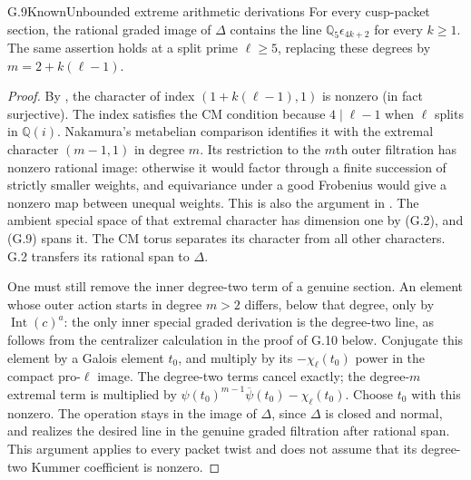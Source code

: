 \begin{statement}{G.9}{Known}{Unbounded extreme arithmetic derivations}
For every cusp-packet section, the rational graded image of $\Delta$
contains the line $\mathbb Q_5\epsilon_{4k+2}$ for every $k\ge1$.
The same assertion holds at a split prime $\ell\ge5$, replacing these
degrees by $m=2+k(\ell-1)$.
\end{statement}
\begin{proof}
By \citet[Theorem 1.5(4)]{Ishii2025}, the character of index
$(1+k(\ell-1),1)$ is nonzero (in fact surjective). The index satisfies
the CM condition because $4\mid\ell-1$ when $\ell$ splits in
$\mathbb Q(i)$. Nakamura's metabelian comparison identifies it with
the extremal character $(m-1,1)$ in degree $m$.
Its restriction to the $m$th outer filtration has nonzero rational
image: otherwise it would factor through a finite succession of
strictly smaller weights, and equivariance under a good Frobenius
would give a nonzero map between unequal weights. This is also the
argument in \citet[Claim 4.14.1 and equation 4.14.2]{Nakamura1995}.
The ambient special space of that extremal character has dimension
one by (G.2), and (G.9) spans it. The CM torus separates its character
from all other characters. G.2 transfers its rational span to
$\Delta$.

One must still remove the inner degree-two term of a genuine section.
An element whose outer action starts in degree $m>2$ differs, below
that degree, only by $\operatorname{Int}(c)^a$: the only inner special
graded derivation is the degree-two line, as follows from the
centralizer calculation in the proof of G.10 below. Conjugate this
element by a Galois element $t_0$, and multiply by its
$-\chi_\ell(t_0)$ power in the compact pro-$\ell$ image. The
degree-two terms cancel exactly; the degree-$m$ extremal term is
multiplied by
$\psi(t_0)^{m-1}\overline\psi(t_0)-\chi_\ell(t_0)$.
Choose $t_0$ with this nonzero. The operation stays in the image of
$\Delta$, since $\Delta$ is closed and normal, and realizes the
desired line in the genuine graded filtration after rational span.
This argument applies to every packet twist and does not assume
that its degree-two Kummer coefficient is nonzero.
\end{proof}


